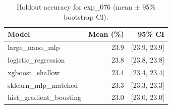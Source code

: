 \begin{table}[ht]
\centering
\caption{Holdout accuracy for exp_076 (mean $\pm$ 95\% bootstrap CI).}
\label{tab:exp_076}
\begin{tabular}{lrr}
\toprule
Model & Mean (\%) & 95\% CI \\
\midrule
large\_nano\_mlp & 23.9 & [23.9, 23.9] \\
logistic\_regression & 23.8 & [23.8, 23.8] \\
xgboost\_shallow & 23.4 & [23.4, 23.4] \\
sklearn\_mlp\_matched & 23.3 & [23.3, 23.3] \\
hist\_gradient\_boosting & 23.0 & [23.0, 23.0] \\
\bottomrule
\end{tabular}
\end{table}
